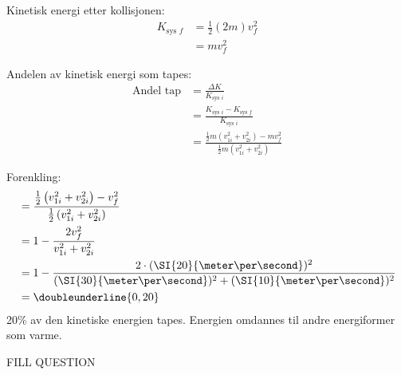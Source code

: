 \documentclass[answers,a4paper,12pt]{exam}
\begin{document}
\begin{questions}
\begin{parts}
\begin{solution}
Kinetisk energi etter kollisjonen:
\begin{align}
K_{\text{sys } f} &= \frac{1}{2} (2m) v_f^2 \\
                  &= m v_f^2
\end{align}

Andelen av kinetisk energi som tapes:
\begin{align}
\text{Andel tap} &= \frac{\Delta K}{K_{\text{sys } i}} \\
                 &= \frac{K_{\text{sys } i} - K_{\text{sys } f}}{K_{\text{sys } i}} \\
                 &= \frac{\frac{1}{2} m \left(v_{1i}^2 + v_{2i}^2\right) - m v_f^2}{\frac{1}{2} m \left(v_{1i}^2 + v_{2i}^2\right)}
\end{align}

Forenkling:
\begin{align}
&= \frac{\frac{1}{2} \left(v_{1i}^2 + v_{2i}^2\right) - v_f^2}{\frac{1}{2} \left(v_{1i}^2 + v_{2i}^2\right)} \\
&= 1 - \frac{2 v_f^2}{v_{1i}^2 + v_{2i}^2} \\
&= 1 - \frac{2 \cdot (\SI{20}{\meter\per\second})^2}{(\SI{30}{\meter\per\second})^2 + (\SI{10}{\meter\per\second})^2} \\
&= \doubleunderline{0,20}
\end{align}
20\% av den kinetiske energien tapes. Energien omdannes til andre energiformer som varme.
\end{solution}

\end{parts}



\question FILL QUESTION
\end{questions}
\end{document}
